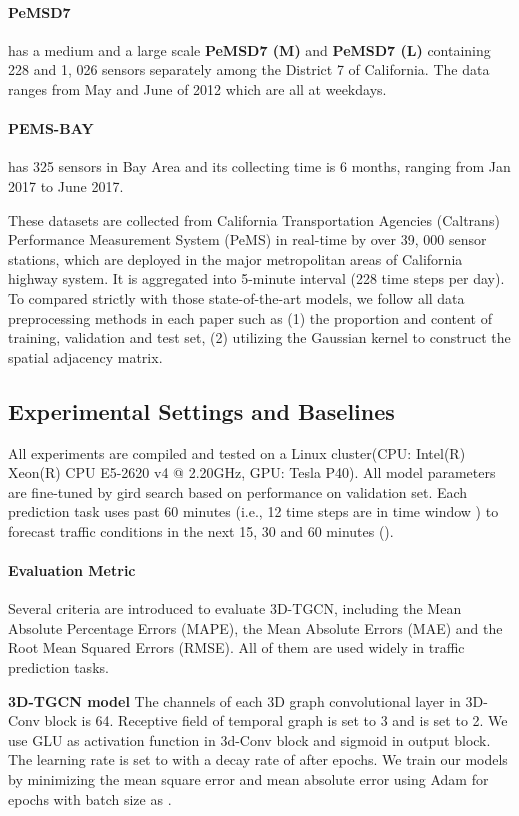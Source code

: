 \documentclass{article}
\begin{document}
\paragraph{PeMSD7} has a medium and a large scale \textbf{PeMSD7 (M)} and \textbf{PeMSD7 (L)} containing 228 and 1, 026 sensors separately among the District 7 of California. The data ranges from May and June of 2012 which are all at weekdays. 

\paragraph{PEMS-BAY} has 325 sensors in Bay Area and its collecting time is 6 months, ranging from Jan 2017 to June 2017.

These datasets are collected from California Transportation Agencies (Caltrans) Performance Measurement System (PeMS) in real-time by over 39, 000 sensor stations, which are deployed in the major metropolitan areas of California highway system\cite{chen2001freeway}. It is aggregated into 5-minute interval (228 time steps per day).
To compared strictly with those state-of-the-art models, we  follow all data preprocessing methods in each paper such as (1) the proportion and content of training, validation and test set, (2) utilizing the Gaussian kernel\cite{shuman2012emerging} to construct the spatial adjacency matrix.

\subsection{Experimental Settings and Baselines}
All experiments are compiled and tested on a Linux cluster(CPU: Intel(R) Xeon(R) CPU E5-2620 v4 @ 2.20GHz, GPU: Tesla P40). All model parameters are fine-tuned by gird search based on performance on validation set. Each prediction task uses past 60 minutes (i.e., 12 time steps are in time window ) to forecast traffic conditions in the next 15, 30 and 60 minutes ().

\paragraph{Evaluation Metric}
Several criteria are introduced to evaluate 3D-TGCN, including the Mean Absolute Percentage Errors (MAPE), the Mean Absolute Errors (MAE) and the Root Mean Squared Errors (RMSE). All of them are used widely in traffic prediction tasks.

\textbf{3D-TGCN model}
The channels of each 3D graph convolutional layer in 3D-Conv block is 64. Receptive field of temporal graph  is set to 3 and  is set to 2. We use GLU as activation function in 3d-Conv block and sigmoid in output block. The learning rate  is set to  with a decay rate of  after  epochs. We train our models by minimizing the mean square error and mean absolute error using Adam for  epochs with batch size as . 
\end{document}
